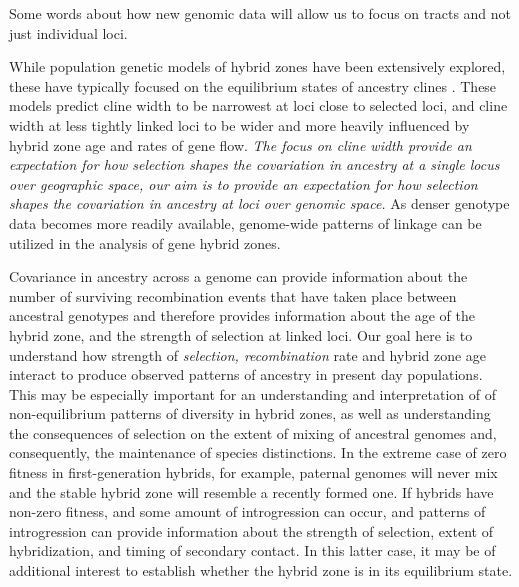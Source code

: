 \documentclass[12pt]{article}
\newcommand{\yb}[1]{{\em \color{magenta} #1}}
\begin{document}
Some words about how new genomic data will allow us to focus on tracts and not just individual loci. 

While population genetic models of hybrid zones have been extensively explored, these have typically focused on the equilibrium states of ancestry clines \cite{Barton1979a,Barton1986}. 
These models predict cline width to be narrowest at loci close to selected loci, and cline width at less tightly linked loci to be wider and more heavily influenced by hybrid zone age and rates of gene flow. 
\yb{The focus on cline width provide an expectation for how selection shapes the covariation in ancestry at a single locus over \emph{geographic space}, our aim is to provide an expectation for how selection shapes the covariation in ancestry at loci over \emph{genomic space.}}  
As denser genotype data becomes more readily available, genome-wide patterns of linkage can be utilized in the analysis of gene hybrid zones. 

Covariance in ancestry across a genome can provide information about the number of surviving recombination events that have taken place between ancestral genotypes and therefore provides information about the age of the hybrid zone, and the strength of selection at linked loci. 
Our goal here is  to understand how strength of \yb{selection, recombination} rate and hybrid zone age interact to produce observed patterns of ancestry in present day populations.  
This may be especially important for an understanding and interpretation of of non-equilibrium patterns of diversity in hybrid zones, as well as understanding the consequences of selection on the extent of mixing of ancestral genomes and, consequently, the maintenance of species distinctions. In the extreme case of zero fitness in first-generation hybrids, for example, paternal genomes will never mix and the stable hybrid zone will resemble a recently formed one. If hybrids have non-zero fitness, and some amount of introgression can occur, and patterns of introgression can provide information about the strength of selection, extent of hybridization, and timing of secondary contact. In this latter case, it may be of additional interest to establish whether the hybrid zone is in its equilibrium state. 
\end{document}
